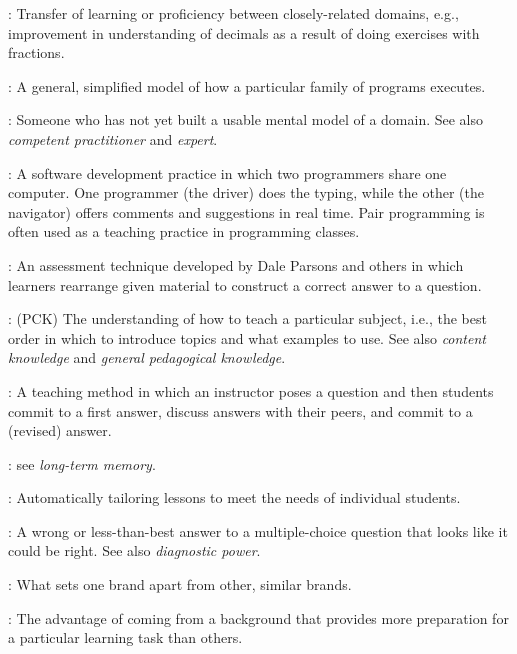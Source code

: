 \begin{description}
: Transfer of learning or proficiency
between closely-related domains, e.g., improvement in understanding of decimals
as a result of doing exercises with fractions.

: A general, simplified model of how
a particular family of programs executes.

: Someone who has not yet built a usable mental model of
a domain. See also \emph{competent practitioner} and \emph{expert}.

: A software development practice in
which two programmers share one computer. One programmer (the driver) does the
typing, while the other (the navigator) offers comments and suggestions in real
time. Pair programming is often used as a teaching practice in programming
classes.

: An assessment technique developed by
Dale Parsons and others in which learners rearrange given material to construct
a correct answer to a question.

: (PCK)
The understanding of how to teach a particular subject, i.e., the best order in
which to introduce topics and what examples to use. See also \emph{content
  knowledge} and \emph{general pedagogical knowledge}.

: A teaching method in which an
instructor poses a question and then students commit to a first answer, discuss
answers with their peers, and commit to a (revised) answer.

: see \emph{long-term memory}.

: Automatically tailoring
lessons to meet the needs of individual students.

: A wrong or less-than-best
answer to a multiple-choice question that looks like it could be right. See also
\emph{diagnostic power}.

: What sets one brand apart from other,
similar brands.

: The advantage of coming
from a background that provides more preparation for a particular learning task
than others.


\end{description}
